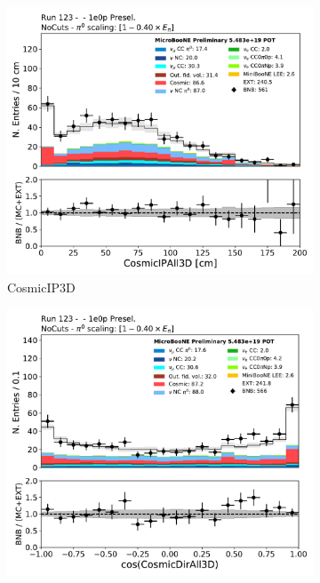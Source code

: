 \begin{figure}[H] 
\begin{center}
    \begin{subfigure}[b]{0.3\textwidth}
    \centering
    \includegraphics[width=1.00\textwidth]{1e0p/dataMCRun123/CosmicIPAll3D.pdf}
    \caption{\label{fig:1e0p:dataMCRun1:CosmicIP} CosmicIP3D }
    \end{subfigure}
    \begin{subfigure}[b]{0.3\textwidth}
    \centering
    \includegraphics[width=1.00\textwidth]{1e0p/dataMCRun123/CosmicDirAll3D.pdf}

\end{subfigure}
\end{center}
\end{figure}
